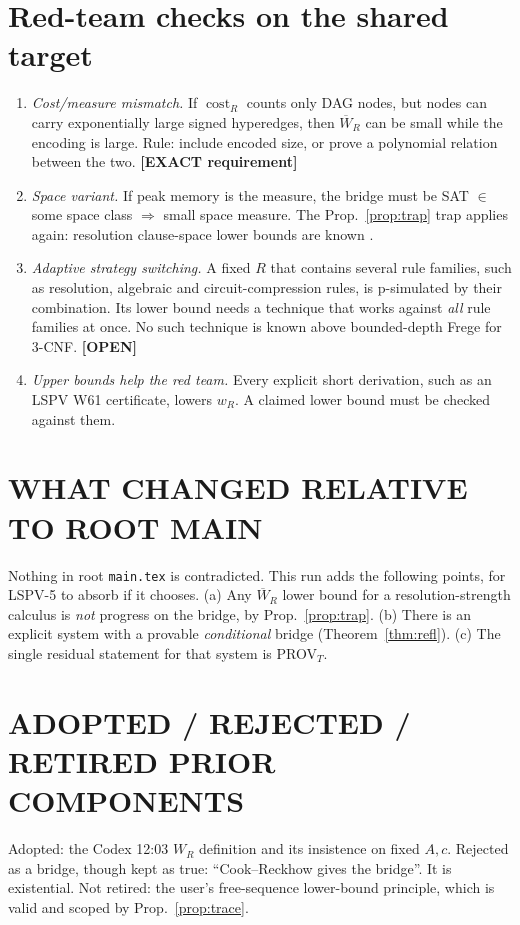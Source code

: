 \documentclass[11pt]{article}
\theoremstyle{definition}
\theoremstyle{remark}
\newcommand{\cost}{\operatorname{cost}}
\newcommand{\Wb}{\overline W}
\newcommand{\status}[1]{\textbf{[#1]}}
\begin{document}
\section{Red-team checks on the shared target}
\begin{enumerate}
\item \emph{Cost/measure mismatch.} If $\cost_R$ counts only DAG nodes, but
nodes can carry exponentially large signed hyperedges, then $\Wb_R$ can be
small while the encoding is large. Rule: include encoded size, or prove a
polynomial relation between the two. \status{EXACT requirement}
\item \emph{Space variant.} If peak memory is the measure, the bridge must be
SAT $\in$ some space class $\Rightarrow$ small space measure. The Prop.~\ref{prop:trap}
trap applies again: resolution clause-space lower bounds are known
\cite{bsg2003}.
\item \emph{Adaptive strategy switching.} A fixed $R$ that contains several
rule families, such as resolution, algebraic and circuit-compression rules, is
p-simulated by their combination. Its lower bound needs a technique that
works against \emph{all} rule families at once. No such technique is known
above bounded-depth Frege for 3-CNF. \status{OPEN}
\item \emph{Upper bounds help the red team.} Every explicit short derivation,
such as an LSPV W61 certificate, lowers $w_R$. A claimed lower bound
must be checked against them.
\end{enumerate}

\section{WHAT CHANGED RELATIVE TO ROOT MAIN}
Nothing in root \texttt{main.tex} is contradicted. This run adds the following
points, for LSPV-5 to absorb if it chooses. (a) Any $\Wb_R$ lower bound for a
resolution-strength calculus is \emph{not} progress on the bridge, by
Prop.~\ref{prop:trap}. (b) There is an explicit system with a provable
\emph{conditional} bridge (Theorem~\ref{thm:refl}). (c) The single residual
statement for that system is PROV$_T$.

\section{ADOPTED / REJECTED / RETIRED PRIOR COMPONENTS}
Adopted: the Codex 12:03 $W_R$ definition and its insistence on fixed $A,c$.
Rejected as a bridge, though kept as true: ``Cook--Reckhow gives the bridge''.
It is existential. Not retired: the user's free-sequence lower-bound principle,
which is valid and scoped by Prop.~\ref{prop:trace}.
\end{document}
